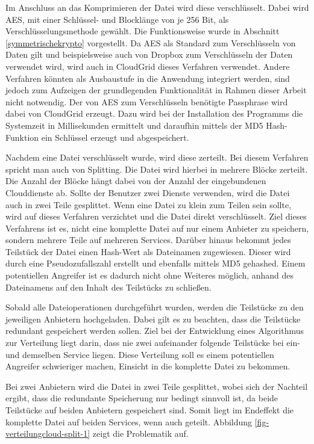 Im Anschluss an das Komprimieren der Datei wird diese verschlüsselt.
Dabei wird \ac{AES}, mit einer Schlüssel- und Blocklänge von je 256 Bit, als Verschlüsselungsmethode gewählt.
Die Funktionsweise wurde in Abschnitt \ref{symmetrischekrypto} vorgestellt.
Da \ac{AES} als Standard zum Verschlüsseln von Daten gilt und beispielsweise auch von Dropbox zum Verschlüsseln der Daten verwendet wird\cite[vgl.][]{dros13}, wird auch in CloudGrid dieses Verfahren verwendet.
Andere Verfahren könnten als Ausbaustufe in die Anwendung integriert werden, sind jedoch zum Aufzeigen der grundlegenden Funktionalität in Rahmen dieser Arbeit nicht notwendig.
Der von \ac{AES} zum Verschlüsseln benötigte Passphrase wird dabei von CloudGrid erzeugt.
Dazu wird bei der Installation des Programms die Systemzeit in Millisekunden ermittelt und daraufhin mittels der \ac{MD5} Hash-Funktion ein Schlüssel erzeugt und abgespeichert.

Nachdem eine Datei verschlüsselt wurde, wird diese zerteilt.
Bei diesem Verfahren spricht man auch von Splitting.
Die Datei wird hierbei in mehrere Blöcke zerteilt.
Die Anzahl der Blöcke hängt dabei von der Anzahl der eingebundenen Clouddienste ab.
Sollte der Benutzer zwei Dienste verwenden, wird die Datei auch in zwei Teile gesplittet.
Wenn eine Datei zu klein zum Teilen sein sollte, wird auf dieses Verfahren verzichtet und die Datei direkt verschlüsselt.
Ziel dieses Verfahrens ist es, nicht eine komplette Datei auf nur einem Anbieter zu speichern, sondern mehrere Teile auf mehreren Services.
Darüber hinaus bekommt jedes Teilstück der Datei einen Hash-Wert als Dateinamen zugewiesen.
Dieser wird durch eine Pseudozufallszahl erstellt und ebenfalls mittels \ac{MD5} gehashed.
Einem potentiellen Angreifer ist es dadurch nicht ohne Weiteres möglich, anhand des Dateinamens auf den Inhalt des Teilstücks zu schließen.

Sobald alle Dateioperationen durchgeführt wurden, werden die Teilstücke zu den jeweiligen Anbietern hochgeladen.
Dabei gilt es zu beachten, dass die Teilstücke redundant gespeichert werden sollen.
Ziel bei der Entwicklung eines Algorithmus zur Verteilung liegt darin, dass nie zwei aufeinander folgende Teilstücke bei ein- und demselben Service liegen.
Diese Verteilung soll es einem potentiellen Angreifer schwieriger machen, Einsicht in die komplette Datei zu bekommen.

Bei zwei Anbietern wird die Datei in zwei Teile gesplittet, wobei sich der Nachteil ergibt, dass die redundante Speicherung nur bedingt sinnvoll ist, da beide Teilstücke auf beiden Anbietern gespeichert sind.
Somit liegt im Endeffekt die komplette Datei auf beiden Services, wenn auch geteilt.
Abbildung \ref{fig-verteilungcloud-split-1} zeigt die Problematik auf.

